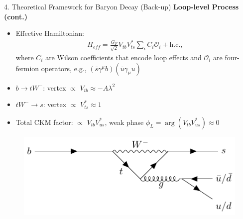 \documentclass[xcolor=dvipsnames]{beamer}
\def\c{\gamma}
\def\l{\lambda}
\def\bigO{\mathcal{O}}
\begin{document}
\begin{frame}{4. Theoretical Framework for Baryon Decay (Back-up)}
\textbf{Loop-level Process (cont.)}\\
\begin{itemize}
    \item Effective Hamiltonian:
    \begin{align*}
        H_{eff}=\frac{G_{F}}{\sqrt{2}}V_{tb}V_{ts}^\ast\sum_{i}C_{i}\bigO_{i}+\mathrm{h.c.},
    \end{align*}
    where $C_{i}$ are Wilson coefficients that encode loop effects and $\bigO_{i}$ are four-fermion operators, e.g., $(\bar{s}\c^{\mu}b)(\bar{u}\c_{\mu}u)$
    \item $b\to tW^{-}$: vertex $\propto$ $V_{tb}\approx -A\l^2$
    \item $tW^{-}\to s$: vertex $\propto$ $V_{ts}^\ast\approx 1$
    \item Total CKM factor: $\propto$ $V_{tb}V_{us}^\ast$, weak phase $\phi_{L}=\arg(V_{tb}V_{us}^\ast)\approx 0$
\end{itemize}
\begin{figure}
    \centering
    \includegraphics[width=0.6\linewidth]{b_loop.pdf}
\end{figure}
\end{frame}
\end{document}
